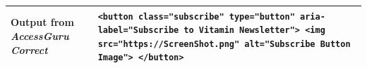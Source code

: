 \documentclass[sigconf, nonacm]{acmart}
\newcommand{\method}{\emph{AccessGuru}}
\begin{document}
\begin{table}[t]
{\begin{tabular}{|p{3cm}|p{15cm}|}
\textbf{Output from \method{} \emph{Correct}} 
& \texttt{<button class="subscribe" type="button" aria-label="Subscribe to Vitamin Newsletter"> <img src="https://ScreenShot.png" alt="Subscribe Button Image"> </button>} \\ \hline
\end{tabular}}
\end{table}



\renewcommand{\arraystretch}{1.3}
\begin{table}
\caption{Example JSON entry from \method’s output for a semantic violation from Listing~\ref{lst:accessibility_not_fixed} (Violation 5, Line 25). It consists of: (1) the violation $v$ output from \method{} \emph{Detect}; (2) input to \method \emph{Correct}, which is the output from \method{} \emph{Detect} along with the contextual information; and (3) the output correction generated by \method{} \emph{Correct}.}


\end{table}
\end{document}
